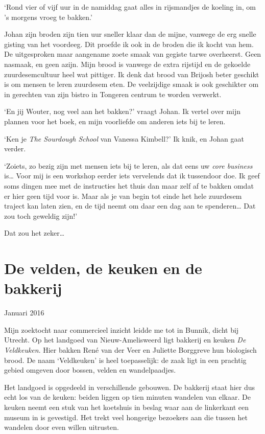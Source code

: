 \documentclass[
  11pt,
  dutch,
]{memoir}
\begin{document}
`Rond vier of vijf uur in de namiddag gaat alles in rijsmandjes de
koeling in, om 's morgens vroeg te bakken.'

Johan zijn broden zijn tien uur sneller klaar dan de mijne, vanwege de
erg snelle gisting van het voordeeg. Dit proefde ik ook in de broden die
ik kocht van hem. De uitgesproken maar aangename zoete smaak van gegiste
tarwe overheerst. Geen nasmaak, en geen azijn. Mijn brood is vanwege de
extra rijstijd en de gekoelde zuurdesemcultuur heel wat pittiger. Ik
denk dat brood van Brijosh beter geschikt is om mensen te leren
zuurdesem eten. De veelzijdige smaak is ook geschikter om in gerechten
van zijn bistro in Tongeren centrum te worden verwerkt.

`En jij Wouter, nog veel aan het bakken?' vraagt Johan. Ik vertel over
mijn plannen voor het boek, en mijn voorliefde om anderen iets bij te
leren.

`Ken je \emph{The Sourdough School} van Vanessa Kimbell?' Ik knik, en
Johan gaat verder.

`Zoiets, zo bezig zijn met mensen iets bij te leren, als dat eens uw
\emph{core business} is\ldots{} Voor mij is een workshop eerder iets
vervelends dat ik tussendoor doe. Ik geef soms dingen mee met de
instructies het thuis dan maar zelf af te bakken omdat er hier geen tijd
voor is. Maar als je van begin tot einde het hele zuurdesem traject kan
laten zien, en de tijd neemt om daar een dag aan te spenderen\ldots{}
Dat zou toch geweldig zijn!'

Dat zou het zeker\ldots{}

\hypertarget{de-velden-de-keuken-en-de-bakkerij}{%
\section{De velden, de keuken en de
bakkerij}\label{de-velden-de-keuken-en-de-bakkerij}}

\begin{flushright}
Januari 2016
\end{flushright}

Mijn zoektocht naar commercieel inzicht leidde me tot in Bunnik, dicht
bij Utrecht. Op het landgoed van Nieuw-Amelisweerd ligt bakkerij en
keuken \emph{De Veldkeuken}. Hier bakken René van der Veer en Juliette
Borggreve hun biologisch brood. De naam `Veldkeuken' is heel
toepasselijk: de zaak ligt in een prachtig gebied omgeven door bossen,
velden en wandelpaadjes.

Het landgoed is opgedeeld in verschillende gebouwen. De bakkerij staat
hier dus echt los van de keuken: beiden liggen op tien minuten wandelen
van elkaar. De keuken neemt een stuk van het koetshuis in beslag waar
aan de linkerkant een museum in is gevestigd. Het trekt veel hongerige
bezoekers aan die tussen het wandelen door even willen uitrusten.
\end{document}
